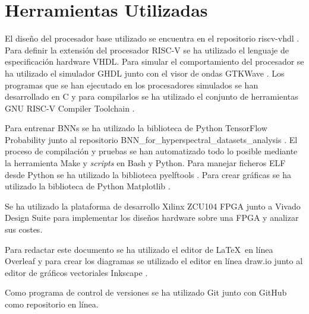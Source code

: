 \section{Herramientas Utilizadas}

El diseño del procesador base utilizado se encuentra en el repositorio riscv-vhdl \cite{base_riscv_cpu_git}. Para definir la extensión del procesador RISC-V se ha utilizado el lenguaje de especificación hardware VHDL. Para simular el comportamiento del procesador se ha utilizado el simulador GHDL \cite{ghdl} junto con el visor de ondas GTKWave \cite{gtkwave}. Los programas que se han ejecutado en los procesadores simulados se han desarrollado en C y para compilarlos se ha utilizado el conjunto de herramientas GNU RISC-V Compiler Toolchain \cite{gcc_riscv}. 

Para entrenar BNNs se ha utilizado la biblioteca de Python TensorFlow Probability \cite{tfprob} junto al repositorio BNN\_for\_hyperspectral\_datasets\_analysis \cite{bnn_hyper_git}. El proceso de compilación y pruebas se han automatizado todo lo posible mediante la herramienta Make y \textit{scripts} en Bash y Python. Para manejar ficheros ELF desde Python se ha utilizado la biblioteca pyelftools \cite{pyelftools}. Para crear gráficas se ha utilizado la biblioteca de Python Matplotlib \cite{matplotlib}. 

Se ha utilizado la plataforma de desarrollo Xilinx ZCU104 FPGA \cite{fpga_board} junto a Vivado Design Suite \cite{vivado} para implementar los diseños hardware sobre una FPGA y analizar sus costes.

Para redactar este documento se ha utilizado el editor de \LaTeX\ en línea Overleaf \cite{overleaf} y para crear los diagramas se utilizado el editor en línea draw.io \cite{drawio} junto al editor de gráficos vectoriales Inkscape \cite{inkscape}.

Como programa de control de versiones se ha utilizado Git \cite{git} junto con GitHub \cite{github} como repositorio en línea.